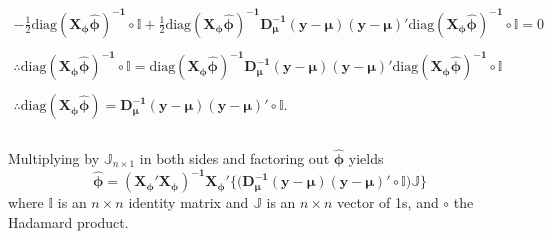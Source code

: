 \documentclass[useAMS,referee]{biom}
\begin{document}
\begin{equation}\label{eqphi}
\begin{array}{l}
-\frac{1}{2}\mbox{diag}\boldsymbol{ (\mathbf{X}_\phi \hat{\phi})^{-1}}\circ \mathbb{I}+\frac{1}{2}\mbox{diag}\boldsymbol{ (X_\phi \hat{\phi})^{-1}\mathbf{D}_\mu^{-1}}(\mathbf{y}-\boldsymbol{\mu})(\mathbf{y}-\boldsymbol{\mu})'\mbox{diag}\boldsymbol{( \mathbf{X}_\phi \hat{\phi})^{-1}}\circ \mathbb{I} =0 \nonumber\\~\\

\therefore\mbox{diag}\boldsymbol{ (X_\phi \hat{\phi})^{-1}}\circ \mathbb{I}=\mbox{diag}\boldsymbol{ (\mathbf{X}_\phi \hat{\phi})^{-1}\mathbf{D}_\mu^{-1}}(\mathbf{y}-\boldsymbol{\mu})(\mathbf{y}-\boldsymbol{\mu})'\mbox{diag}\boldsymbol{( \mathbf{X}_\phi \hat{\phi})^{-1}} \nonumber\circ \mathbb{I}\\~\\



\therefore\mbox{diag}\boldsymbol{ (\mathbf{X}_\phi \hat{\phi})}=\mathbf{D_\mu^{-1}}(\mathbf{y}-\boldsymbol{\mu})(\mathbf{y}-\boldsymbol{\mu})'\circ \mathbb{I}\nonumber.\\

\end{array}
\end{equation}\\
Multiplying by $\mathbb{J}_{n \times 1}$ in both sides and factoring out $\boldsymbol{\hat\phi}$ yields
\begin{equation}
\boldsymbol{\hat{\phi}} = \mathbf{(X_\phi'X_\phi)^{-1}X_\phi'}\mathbf{\{(D_\mu^{-1}}(\mathbf{y}-\boldsymbol{\mu})(\mathbf{y}-\boldsymbol{\mu})'\circ \mathbb{I}) \mathbb{J}\} 
\end{equation}
where $\mathbb{I}$ is an $n \times n$ identity matrix and $\mathbb{J}$ is an $n \times n$ vector of 1s, and $\circ$ the Hadamard product.



\end{document}
